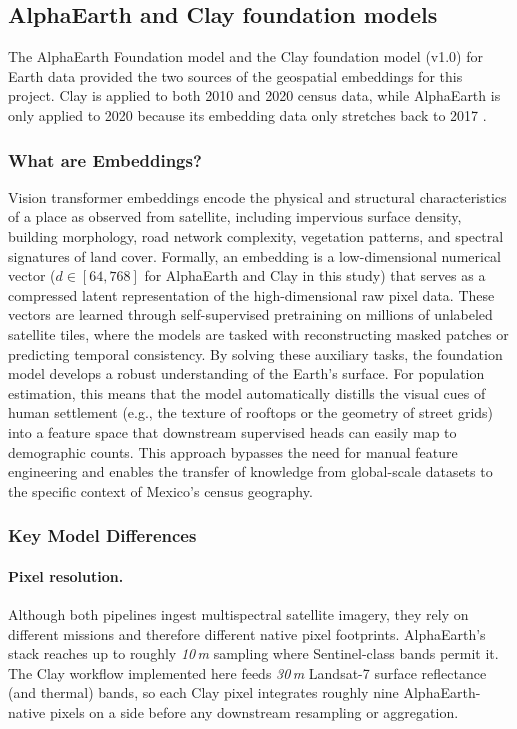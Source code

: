 \documentclass[12pt,letterpaper]{article}
\begin{document}
\subsection{AlphaEarth and Clay foundation models}
\label{subsec:alphaearth_clay}
The AlphaEarth Foundation model and the Clay foundation model (v1.0) for Earth data provided the two sources of the geospatial embeddings for this project. Clay is applied to both 2010 and 2020 census data, while AlphaEarth is only applied to 2020 because its embedding data only stretches back to 2017 \parencite{Brownetal2025}.

\subsubsection{What are Embeddings?}
Vision transformer embeddings encode the physical and structural characteristics of a place as observed from satellite, including impervious surface density, building morphology, road network complexity, vegetation patterns, and spectral signatures of land cover. Formally, an embedding is a low-dimensional numerical vector ($d \in [64, 768]$ for AlphaEarth and Clay in this study) that serves as a compressed latent representation of the high-dimensional raw pixel data. These vectors are learned through self-supervised pretraining on millions of unlabeled satellite tiles, where the models are tasked with reconstructing masked patches or predicting temporal consistency. By solving these auxiliary tasks, the foundation model develops a robust understanding of the Earth's surface. For population estimation, this means that the model automatically distills the visual cues of human settlement (e.g., the texture of rooftops or the geometry of street grids) into a feature space that downstream supervised heads can easily map to demographic counts. This approach bypasses the need for manual feature engineering and enables the transfer of knowledge from global-scale datasets to the specific context of Mexico's census geography.

\subsubsection{Key Model Differences}
\paragraph{Pixel resolution.}
Although both pipelines ingest multispectral satellite imagery, they rely on different missions and therefore different native pixel footprints. AlphaEarth's stack reaches up to roughly \emph{10\,m} sampling where Sentinel-class bands permit it. The Clay workflow implemented here feeds \emph{30\,m} Landsat-7 surface reflectance (and thermal) bands, so each Clay pixel integrates roughly nine AlphaEarth-native pixels on a side before any downstream resampling or aggregation.
\end{document}
